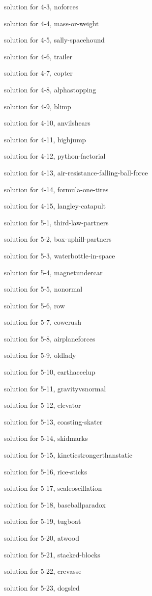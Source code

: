 \documentclass{problems}
\begin{document}
solution for 4-3, noforces

solution for 4-4, mass-or-weight

solution for 4-5, sally-spacehound

solution for 4-6, trailer

solution for 4-7, copter

solution for 4-8, alphastopping

solution for 4-9, blimp

solution for 4-10, anvilshears

solution for 4-11, highjump

solution for 4-12, python-factorial

solution for 4-13, air-resistance-falling-ball-force

solution for 4-14, formula-one-tires

solution for 4-15, langley-catapult

solution for 5-1, third-law-partners

solution for 5-2, box-uphill-partners

solution for 5-3, waterbottle-in-space

solution for 5-4, magnetundercar

solution for 5-5, nonormal

solution for 5-6, row

solution for 5-7, cowcrush

solution for 5-8, airplaneforces

solution for 5-9, oldlady

solution for 5-10, earthaccelup

solution for 5-11, gravityvsnormal

solution for 5-12, elevator

solution for 5-13, coasting-skater

solution for 5-14, skidmarks

solution for 5-15, kineticstrongerthanstatic

solution for 5-16, rice-sticks

solution for 5-17, scaleoscillation

solution for 5-18, baseballparadox

solution for 5-19, tugboat

solution for 5-20, atwood

solution for 5-21, stacked-blocks

solution for 5-22, crevasse

solution for 5-23, dogsled
\end{document}
